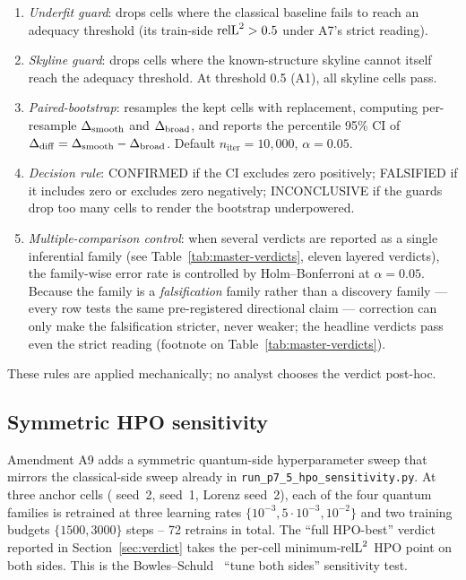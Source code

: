 \begin{enumerate}
  \item \emph{Underfit guard}: drops cells where the classical
        baseline fails to reach an adequacy threshold (its train-side
        $\mathrm{relL}^2 > 0.5$ under A7's strict reading).
  \item \emph{Skyline guard}: drops cells where the known-structure
        skyline cannot itself reach the adequacy threshold.
        At threshold 0.5 (A1), all skyline cells pass.
  \item \emph{Paired-bootstrap}: resamples the kept cells with
        replacement, computing per-resample $\Delta_{\mathrm{smooth}}$ and
        $\Delta_{\mathrm{broad}}$, and reports the percentile 95\% CI of
        $\Delta_{\mathrm{diff}} = \Delta_{\mathrm{smooth}} - \Delta_{\mathrm{broad}}$. Default $n_{\text{iter}} =
        10{,}000$, $\alpha = 0.05$.
  \item \emph{Decision rule}: CONFIRMED if the CI excludes zero
        positively; FALSIFIED if it includes zero or excludes
        zero negatively; INCONCLUSIVE if the guards drop too
        many cells to render the bootstrap underpowered.
  \item \emph{Multiple-comparison control}: when several verdicts
        are reported as a single inferential family
        (see Table~\ref{tab:master-verdicts}, eleven layered
        verdicts), the family-wise error rate is controlled by
        Holm--Bonferroni at $\alpha = 0.05$. Because the family is
        a \emph{falsification} family rather than a discovery
        family --- every row tests the same pre-registered
        directional claim --- correction can only make the
        falsification stricter, never weaker; the headline
        verdicts pass even the strict reading (footnote on
        Table~\ref{tab:master-verdicts}).
\end{enumerate}

These rules are applied mechanically; no analyst chooses the
verdict post-hoc.

\subsection{Symmetric HPO sensitivity}
\label{sec:methods-hpo}

Amendment A9 adds a symmetric quantum-side hyperparameter sweep
that mirrors the classical-side sweep already in
\texttt{run\_p7\_5\_hpo\_sensitivity.py}. At three anchor cells
(\lv{} seed~2, \vdp{} seed~1, Lorenz seed~2), each
of the four quantum families is retrained at three learning
rates $\{10^{-3}, 5 \cdot 10^{-3}, 10^{-2}\}$ and two training
budgets $\{1500, 3000\}$ steps -- 72 retrains in total. The
``full HPO-best'' verdict reported in Section~\ref{sec:verdict}
takes the per-cell minimum-$\mathrm{relL}^2$ HPO point on both sides.
This is the Bowles--Schuld~\cite{bowles2024better} ``tune both
sides'' sensitivity test.

